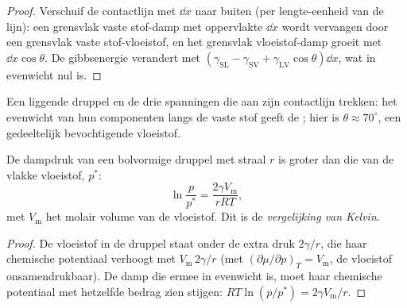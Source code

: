 \begin{proof}
Verschuif de contactlijn met $\dd x$ naar buiten (per lengte-eenheid van de
lijn): een grensvlak vaste stof-damp met oppervlakte $\dd x$ wordt vervangen door
een grensvlak vaste stof-vloeistof, en het grensvlak vloeistof-damp groeit met $\dd x\cos\theta$. De gibbsenergie
verandert met
$(\gamma_{\mathrm{SL}} - \gamma_{\mathrm{SV}} + \gamma_{\mathrm{LV}}\cos\theta)\dd x$, wat in evenwicht nul is.
\end{proof}

\begin{omfigure}

{\small Een liggende druppel en de drie spanningen die aan zijn contactlijn
trekken: het evenwicht van hun componenten langs de vaste stof geeft de
; hier is $\theta
\approx 70^\circ$, een gedeeltelijk bevochtigende vloeistof.}
\end{omfigure}

\begin{theorem}\label{thm:b3:colloids:kelvin}
De dampdruk van een bolvormige druppel met straal $r$ is groter dan die
van de vlakke vloeistof, $p^*$:
\[
  \ln\frac{p}{p^*} = \frac{2\gamma V_{\mathrm m}}{rRT},
\]
met $V_{\mathrm m}$ het molair volume van de vloeistof. Dit is de
\emph{vergelijking van Kelvin}.
\end{theorem}

\begin{proof}
De vloeistof in de druppel staat onder de extra druk $2\gamma/r$, die haar
chemische potentiaal verhoogt met $V_{\mathrm m}\,2\gamma/r$ (met $(\partial\mu/\partial p)_T = V_{\mathrm m}$, de vloeistof onsamendrukbaar).
De damp die ermee in evenwicht is, moet haar chemische potentiaal met
hetzelfde bedrag zien stijgen: $RT\ln(p/p^*) = 2\gamma V_{\mathrm m}/r$.
\end{proof}

